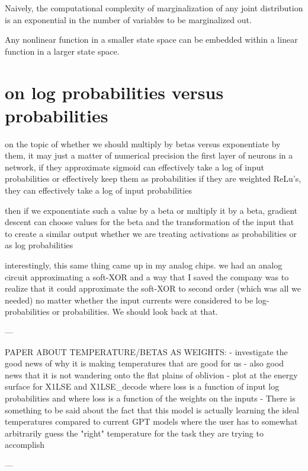 Naively, the computational complexity of marginalization of any joint distribution is an exponential in the number of variables to be marginalized out.\cite{}

Any nonlinear function in a smaller state space can be embedded within a linear function in a larger state space.\cite{universal set of Tofolli gates}\cite{universal set of Fredkin gates}



\section{on log probabilities versus probabilities}

on the topic of whether we should multiply by betas versus exponentiate by them, it may just a matter of numerical precision the first layer of neurons in a network, if they approximate sigmoid can effectively take a log of input probabilities or effectively keep them as probabilities
if they are weighted ReLu's, they can effectively take a log of input probabilities

then if we exponentiate such a value by a beta or multiply it by a beta, gradient descent can choose values for the beta and the transformation of the input that to create a similar output whether we are treating activations as probabilities or as log probabilities

interestingly, this same thing came up in my analog chips.  we had an analog circuit approximating a soft-XOR and a way that I saved the company was to realize that it could approximate the soft-XOR to second order (which was all we needed) no matter whether the input currents were considered to be log-probabilities or probabilities.  We should look back at that.

---

PAPER ABOUT TEMPERATURE/BETAS AS WEIGHTS:
- investigate the good news of why it is making temperatures that are good for us
- also good news that it is not wandering onto the flat plains of oblivion
- plot at the energy surface for X1LSE and X1LSE_decode where loss is a function of input log probabilities and where 
loss is a function of the weights on the inputs
- There is something to be said about the fact that this model is actually learning the ideal temperatures compared to current
GPT models where the user has to somewhat arbitrarily guess the "right" temperature for the task they are trying to accomplish

---


